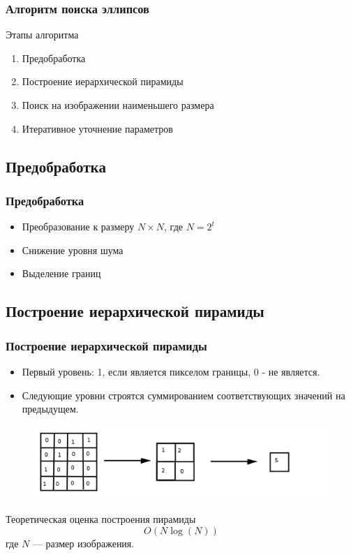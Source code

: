 \documentclass[14pt]{beamer}
\begin{document}
\begin{frame}
\frametitle{Алгоритм поиска эллипсов}
\begin{block}{Этапы алгоритма}
\begin{enumerate}
  \item Предобработка
  \item Построение иерархической пирамиды
  \item Поиск на изображении наименьшего размера
  \item Итеративное уточнение параметров
\end{enumerate}
\end{block}
\end{frame}

\subsection{Предобработка}
\begin{frame}
\frametitle{Предобработка}
\begin{block}{}
\begin{itemize}
  \item Преобразование к размеру $N \times N$, где $N = 2^t$
  \item Снижение уровня шума
  \item Выделение границ
\end{itemize}
\end{block}
\end{frame}

\subsection{Построение иерархической пирамиды}
\begin{frame}
\frametitle{Построение иерархической пирамиды}
\begin{block}{}
\begin{itemize}
  \item Первый уровень: 1, если является пикселом границы, 0 - не является.
  \item Следующие уровни строятся суммированием соответствующих значений на предыдущем.
\end{itemize}
\end{block}
\begin{figure}[H]
  \center
  \includegraphics[width=0.7\linewidth]{pyramidcreation}
\end{figure}
\begin{block}{Теоретическая оценка построения пирамиды}
$$O(N\log(N))$$ где $N$ --- размер изображения.
\end{block}
\end{frame}
\end{document}
